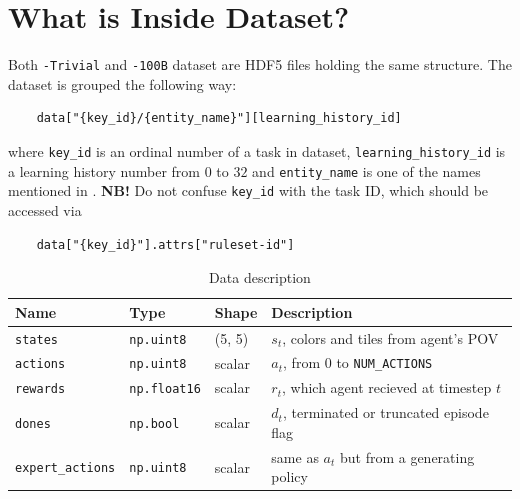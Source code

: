 \documentclass{article}
\begin{document}
\section{What is Inside Dataset?}
\label{apndx:data-explanation}
Both \texttt{-Trivial} and \texttt{-100B} dataset are HDF5 files holding the same structure. The dataset is grouped the following way:
\begin{verbatim}
    data["{key_id}/{entity_name}"][learning_history_id]
\end{verbatim}
where \texttt{key\_id} is an ordinal number of a task in dataset, \texttt{learning\_history\_id} is a learning history number from $0$ to $32$ and \texttt{entity\_name} is one of the names mentioned in .
\textbf{NB!} Do not confuse \texttt{key\_id} with the task ID, which should be accessed via
\begin{verbatim}
    data["{key_id}"].attrs["ruleset-id"]
\end{verbatim}
\begin{table}[h]
\centering
\caption{Data description}
\label{tab:data-desc}
\begin{tabular}{@{}llll@{}}
\toprule
\textbf{Name}           & \textbf{Type}       & \textbf{Shape}  & \textbf{Description}                             \\ \midrule
\texttt{states}         & \texttt{np.uint8}   & (5, 5) & $s_t$, colors and tiles from agent's POV                  \\
\texttt{actions}        & \texttt{np.uint8}   & scalar & $a_t$, from $0$ to \texttt{NUM\_ACTIONS} \\
\texttt{rewards}        & \texttt{np.float16} & scalar & $r_t$, which agent recieved at timestep $t$               \\
\texttt{dones}          & \texttt{np.bool}    & scalar & $d_t$, terminated or truncated episode flag               \\
\texttt{expert\_actions} & \texttt{np.uint8}   & scalar & same as $a_t$ but from a generating policy                \\ \bottomrule
\end{tabular}
\end{table}
\end{document}
